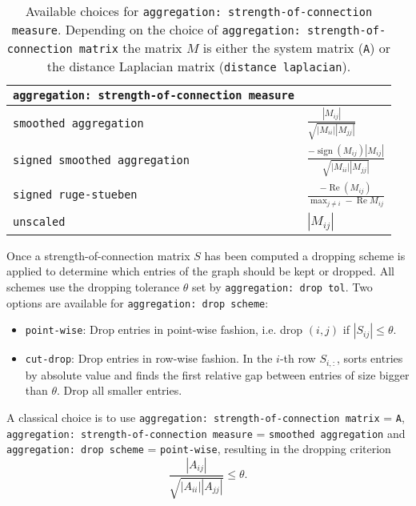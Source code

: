 \begin{table}[H]
  \begin{center}
    \begin{tabular}{ll}
      \verb!aggregation: strength-of-connection measure! & \\
      \toprule
      \verb!smoothed aggregation! & \(\frac{\left|M_{ij}\right|}{\sqrt{\left|M_{ii}\right|\left|M_{jj}\right|}} \) \\
      \verb!signed smoothed aggregation! & \(\frac{-\operatorname{sign} \left(M_{ij}\right) \left|M_{ij}\right|}{\sqrt{\left|M_{ii}\right|\left|M_{jj}\right|}} \) \\
      \verb!signed ruge-stueben! & \(\frac{-\operatorname{Re} \left(M_{ij}\right)}{\max_{j\neq i} -\operatorname{Re}M_{ij}} \) \\
      \verb!unscaled! & \(\left|M_{ij}\right|\) \\
      \bottomrule
    \end{tabular}
    \caption{Available choices for \texttt{aggregation: strength-of-connection measure}. Depending on the choice of \texttt{aggregation: strength-of-connection matrix} the matrix \(M\) is either the system matrix (\texttt{A}) or the distance Laplacian matrix (\texttt{distance laplacian}).}
\label{t:aggregation_soc_measures}
  \end{center}
\end{table}


Once a strength-of-connection matrix \(S\) has been computed a dropping scheme is applied to determine which entries of the graph should be kept or dropped.
All schemes use the dropping tolerance \(\theta\) set by \texttt{aggregation: drop tol}.
Two options are available for \texttt{aggregation: drop scheme}:
\begin{itemize}
\item \texttt{point-wise}: Drop entries in point-wise fashion, i.e. drop \((i,j)\) if \(\left|S_{ij}\right|\leq\theta\).
\item \texttt{cut-drop}: Drop entries in row-wise fashion. In the \(i\)-th row \(S_{i,:}\), sorts entries by absolute value and finds the first relative gap between entries of size bigger than \(\theta\). Drop all smaller entries.
\end{itemize}

A classical choice is to use \texttt{aggregation: strength-of-connection matrix} = \texttt{A}, \texttt{aggregation: strength-of-connection measure} = \texttt{smoothed aggregation} and \texttt{aggregation: drop scheme} = \texttt{point-wise}, resulting in the dropping criterion
\begin{equation}
  \frac{\left|A_{ij}\right|}{\sqrt{\left|A_{ii}\right|\left|A_{jj}\right|}} \leq \theta.
\end{equation}


